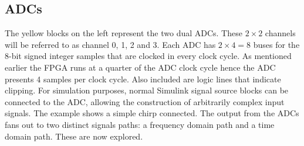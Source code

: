 
\subsection{ADCs}
The yellow blocks on the left represent the two dual ADCs. These \(2 \times 2\) channels will be referred to as channel 0, 1, 2 and 3. Each ADC has \(2 \times 4 = 8\) buses for the 8-bit signed integer samples that are clocked in every clock cycle. As mentioned earlier the FPGA runs at a quarter of the ADC clock cycle hence the ADC presents 4 samples per clock cycle.  Also included are logic lines that indicate clipping. For simulation purposes, normal Simulink signal source blocks can be connected to the ADC, allowing the construction of arbitrarily complex input signals. The example shows a simple chirp connected. The output from the ADCs fans out to two distinct signals paths: a frequency domain path and a time domain path. These are now explored.

